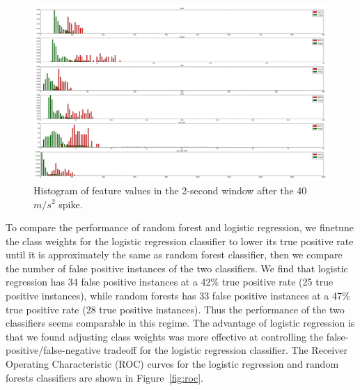 \documentclass{soups}
\begin{document}
\begin{figure}[t]
\begin{center}
\includegraphics[width=\textwidth]{hist_features_after_win_size_1_2.png}
\end{center}
\caption{Histogram of feature values in the 2-second window after the 40 $m/s^2$ spike.}
\label{fig:afterhist}
\end{figure}

To compare the performance of random forest and logistic regression, we finetune the class weights for the logistic regression classifier to lower its true positive rate until it is approximately the same as random forest classifier, then we compare the number of false positive instances of the two classifiers.
We find that logistic regression has 34 false positive instances at a 42\% true positive rate (25 true positive instances),
while random forests has 33 false positive instances at a 47\% true positive rate (28 true positive instances).
Thus the performance of the two classifiers seems comparable in this regime.
The advantage of logistic regression is that we found adjusting class weights was more effective at controlling the false-positive/false-negative tradeoff for the logistic regression classifier.
The Receiver Operating Characteristic (ROC) curves for the logistic regression and random forests classifiers are shown in Figure~\ref{fig:roc}.
\end{document}
